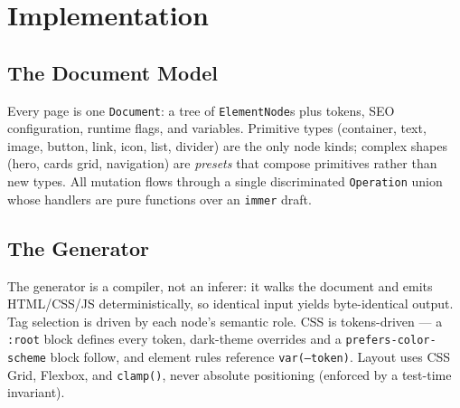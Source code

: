
\chapter{Implementation}
\label{ch:impl}

\section{The Document Model}
Every page is one \texttt{Document}: a tree of \texttt{ElementNode}s plus tokens,
SEO configuration, runtime flags, and variables. Primitive types
(container, text, image, button, link, icon, list, divider) are the only node
kinds; complex shapes (hero, cards grid, navigation) are \emph{presets} that
compose primitives rather than new types. All mutation flows through a single
discriminated \texttt{Operation} union whose handlers are pure functions over an
\texttt{immer} draft.

\section{The Generator}
The generator is a compiler, not an inferer: it walks the document and emits
HTML/CSS/JS deterministically, so identical input yields byte-identical output.
Tag selection is driven by each node's semantic role. CSS is tokens-driven ---
a \texttt{:root} block defines every token, dark-theme overrides and a
\texttt{prefers-color-scheme} block follow, and element rules reference
\texttt{var(--token)}. Layout uses CSS Grid, Flexbox, and \texttt{clamp()}, never
absolute positioning (enforced by a test-time invariant).

